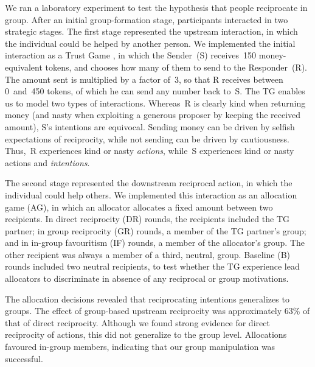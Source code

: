 \documentclass[12pt,a4paper]{article}
\begin{document}
We ran a laboratory experiment to test the hypothesis that people reciprocate in group. After an initial group-formation stage, participants interacted in two strategic stages. The first stage represented the upstream interaction, in which the individual could be helped by another person. We implemented the initial interaction as a Trust Game \citep*[TG,][]{berg1995trust}, in which the Sender~(S) receives~150 money-equivalent tokens, and chooses how many of them to send to the Responder~(R). The amount sent is multiplied by a factor of~3, so that R receives between 0~and~450 tokens, of which he can send any number back to~S. The TG enables us to model two types of interactions. Whereas~R is clearly kind when returning money (and nasty when exploiting a generous proposer by keeping the received amount), S's intentions are equivocal. Sending money can be driven by selfish expectations of reciprocity, while not sending can be driven by cautiousness. Thus,~R experiences kind or nasty \emph{actions}, while~S experiences kind or nasty actions and \emph{intentions}.

The second stage represented the downstream reciprocal action, in which the individual could help others. We implemented this interaction as an allocation game (AG), in which an allocator allocates a fixed amount between two recipients. In direct reciprocity (DR) rounds, the recipients included the TG partner; in group reciprocity (GR) rounds, a member of the TG partner's group; and in in-group favouritism (IF) rounds, a member of the allocator's group. The other recipient was always a member of a third, neutral, group. Baseline (B) rounds included two neutral recipients, to test whether the TG experience lead allocators to discriminate in absence of any reciprocal or group motivations.

The allocation decisions revealed that reciprocating intentions generalizes to groups. The effect of group-based upstream reciprocity was approximately 63\% of that of direct reciprocity. Although we found strong evidence for direct reciprocity of actions, this did not generalize to the group level. Allocations favoured in-group members, indicating that our group manipulation was successful.
\end{document}
